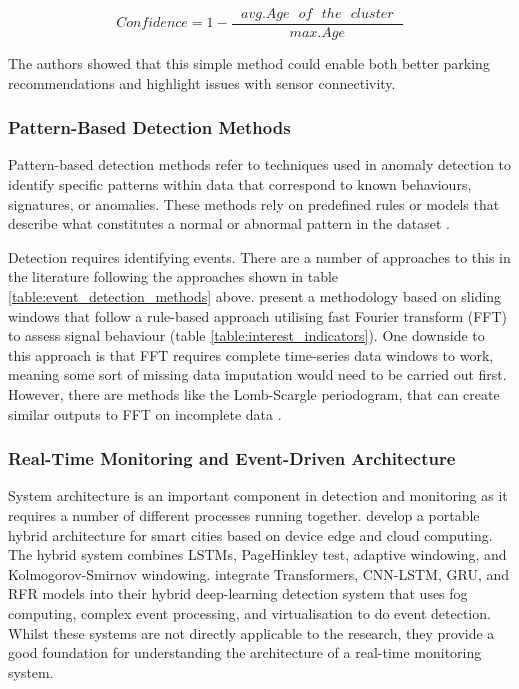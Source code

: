 \begin{equation*}\label{eq:confidence_heuristic}
    Confidence = 1 - \frac{{{\text{ }}avg.Age{\text{ }}of{\text{ }}the{\text{ }}cluster{\text{ }}}}{{{\text{ }}max.Age{\text{ }}}}\tag{6}
\end{equation*}

The authors showed that this simple method could enable both better parking recommendations and highlight issues with sensor connectivity.

\subsubsection{Pattern-Based Detection Methods}
Pattern-based detection methods refer to techniques used in anomaly detection to identify specific patterns within data that correspond to known behaviours, signatures, or anomalies. These methods rely on predefined rules or models that describe what constitutes a normal or abnormal pattern in the dataset \citep{caiMinimalRarePatternBased2023}.

Detection requires identifying events. There are a number of approaches to this in the literature following the approaches shown in table \ref{table:event_detection_methods} above. \cite{kleinRepresentingDataQuality2009} present a methodology based on sliding windows that follow a rule-based approach utilising fast Fourier transform (FFT) to assess signal behaviour (table \ref{table:interest_indicators}). One downside to this approach is that FFT requires complete time-series data windows to work, meaning some sort of missing data imputation would need to be carried out first. However, there are methods like the Lomb-Scargle periodogram, that can create similar outputs to FFT on incomplete data \citep{vanderplasUnderstandingLombScargle2018}.



\subsubsection{Real-Time Monitoring and Event-Driven Architecture}
System architecture is an important component in detection and monitoring as it requires a number of different processes running together. \cite{mehmoodNovelEdgeArchitecture2024} develop a portable hybrid architecture for smart cities based on device edge and cloud computing. The hybrid system combines LSTMs, PageHinkley test, adaptive windowing, and Kolmogorov-Smirnov windowing. \cite{simsekDeepFogAQFogassistedDecentralized2024} integrate Transformers, CNN-LSTM, GRU, and RFR models into their hybrid deep-learning detection system that uses fog computing, complex event processing, and virtualisation to do event detection. Whilst these systems are not directly applicable to the research, they provide a good foundation for understanding the architecture of a real-time monitoring system.

